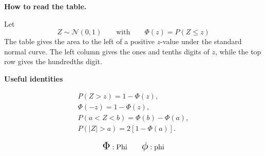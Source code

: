 	\noindent
	\begin{minipage}[t]{0.68\textwidth}
		\vspace{0pt}
		
		\textbf{How to read the table.}
		
		Let \vspace*{-4mm}
		\[
		Z\sim\mathcal{N}(0,1)
		\qquad \textrm{with} \qquad
		\Phi(z)=P(Z\le z)
		\]
		The table gives the area to the left of a positive \(z\)-value under the
		standard normal curve. The left column gives the ones and tenths digits
		of \(z\), while the top row gives the hundredths digit.
		
		\begin{center}
		\end{center}
	\end{minipage}%
	\hfill
	\begin{minipage}[t]{0.28\textwidth}
		\vspace{0pt}
		\centering 
		
		\textbf{Useful identities} \vspace{-8mm}
		
		\begin{gather*}
			P(Z>z)=1-\Phi(z),\\
			\Phi(-z)=1-\Phi(z),\\
			P(a<Z<b)=\Phi(b)-\Phi(a),\\
			P(|Z|>a)=2[1-\Phi(a)].
		\end{gather*}
		
		\vspace{-4mm}
		\[
			\scalebox{1.5}{$\Phi$} : \textrm{Phi} \qquad  
			\scalebox{1.5}{$\phi$} : \textrm{phi}
		\]
	\end{minipage}
	
